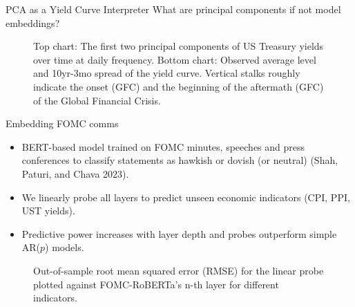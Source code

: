 \documentclass[
  10pt,
  ignorenonframetext,
  aspectratio=169,
  notheorems]{beamer}
\providecommand{\tightlist}{%
  \setlength{\itemsep}{0pt}\setlength{\parskip}{0pt}}\usepackage{longtable,booktabs,array}
\begin{document}
\begin{frame}{PCA as a Yield Curve Interpreter}
\label{pca-as-a-yield-curve-interpreter}
What are principal components if not model embeddings?

\begin{figure}


\caption{\label{fig-pca}Top chart: The first two principal components of
US Treasury yields over time at daily frequency. Bottom chart: Observed
average level and 10yr-3mo spread of the yield curve. Vertical stalks
roughly indicate the onset (\textbar GFC) and the beginning of the
aftermath (GFC\textbar) of the Global Financial Crisis.}

\end{figure}%
\end{frame}

\begin{frame}{Embedding FOMC comms}
\label{embedding-fomc-comms}
\begin{itemize}
\tightlist
\item
  BERT-based model trained on FOMC minutes, speeches and press
  conferences to classify statements as hawkish or dovish (or neutral)
  (Shah, Paturi, and Chava 2023).
\item
  We linearly probe all layers to predict unseen economic indicators
  (CPI, PPI, UST yields).
\item
  Predictive power increases with layer depth and probes outperform
  simple AR(\(p\)) models.
\end{itemize}

\begin{figure}


\caption{\label{fig-mse}Out-of-sample root mean squared error (RMSE) for
the linear probe plotted against FOMC-RoBERTa's n-th layer for different
indicators.}

\end{figure}%
\end{frame}
\end{document}
